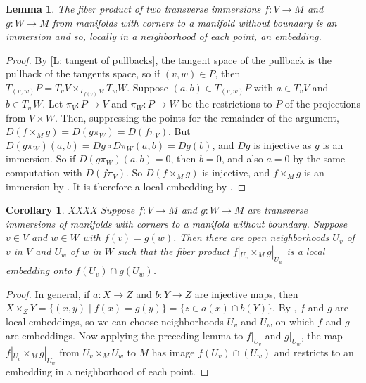 \documentclass[12pt]{article}
\theoremstyle{plain}
\newtheorem{corollary}[theorem]{Corollary}
\newtheorem{lemma}[theorem]{Lemma}
\theoremstyle{definition}
\theoremstyle{remark}
\begin{document}
\begin{lemma}
	The fiber product of two transverse immersions $f \colon V \to M$ and $g \colon W \to M$ from manifolds with corners to a manifold without boundary is an immersion and so, locally in a neighborhood of each point, an embedding.
\end{lemma}
\begin{proof}
	By \cref{L: tangent of pullbacks}, the tangent space of the pullback is the pullback of the tangents space, so if $(v,w) \in P$, then $T_{(v,w)}P = T_vV \times_{T_{f(v)}M} T_wW$. 
	Suppose $(a,b) \in T_{(v,w)}P$ with $a \in T_vV$ and $b \in T_wW$. 
	Let $\pi_V \colon P \to V$ and $\pi_W \colon P \to W$ be the restrictions to $P$ of the projections from $V \times W$.
	Then, suppressing the points for the remainder of the argument, $D(f \times_M g) = D(g\pi_W) = D(f \pi_V)$.
	But $D(g \pi_W)(a,b)=Dg\circ D\pi_W (a,b)=Dg(b)$, and $Dg$ is injective as $g$ is an immersion. 
	So if $D(g \pi_W)(a,b)=0$, then $b=0$, and also $a=0$ by the same computation with $D(f \pi_V)$.
	So $D(f \times_M g)$ is injective, and $f \times_M g$ is an immersion by \cite[Proposition 3.2.6]{MaDo92}.
	It is therefore a local embedding by \cite[Proposition 3.2.13]{MaDo92}.  
\end{proof}

\begin{corollary}
XXXX
Suppose $f \colon V \to M$ and $g \colon W \to M$ are transverse immersions of manifolds with corners to a manifold without boundary. Suppose $v \in V$ and $w \in W$ with $f(v) = g(w)$. 
Then there are open neighborhoods $U_v$ of $v$ in $V$ and $U_w$ of $w$ in $W$ such that the fiber product $f|_{U_v} \times_M g|_{U_w}$ is a local embedding onto $f(U_v) \cap g(U_w)$. 
\end{corollary}

\begin{proof}
In general, if $a: X \to Z$ and $b: Y \to Z$ are injective maps, then $X \times_Z Y = \{(x,y) \mid f(x) = g(y)\} = \{ z \in a(x) \cap b(Y) \}$. 
By \cite[Proposition 3.2.13]{MaDo92}, $f$ and $g$ are local embeddings, so we can choose neighborhoods $U_v$ and $U_w$ on which $f$ and $g$ are embeddings. 
Now applying the preceding lemma to $f|_{U_v}$ and $g|_{U_w}$, the map $f|_{U_v} \times_M g|_{U_w}$ from $U_v \times_M U_w$ to $M$ has image $f(U_v) \cap (U_w)$ and restricts to an embedding in a neighborhood of each point. 
\end{proof}
\end{document}
